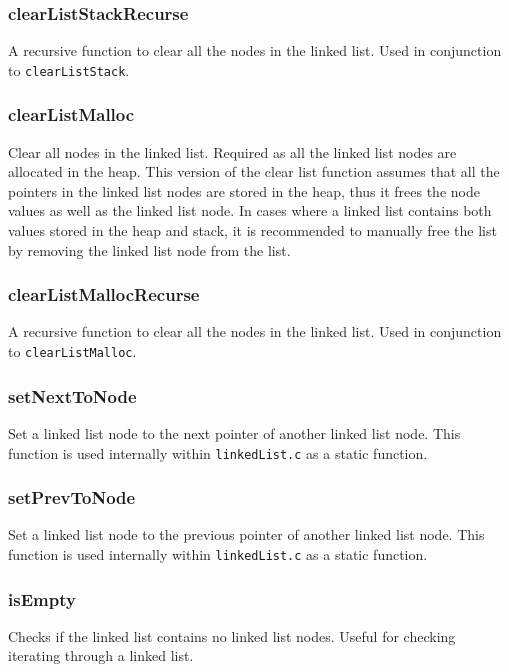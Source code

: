 \documentclass[a4paper, 12pt, titlepage]{article}
\newcommand{\code}[1]{\small\texttt{#1}\normalsize}
\begin{document}
\subsubsection{clearListStackRecurse}

A recursive function to clear all the nodes in the linked list. Used in
conjunction to \code{clearListStack}.

\subsubsection{clearListMalloc}

Clear all nodes in the linked list. Required as all the linked list nodes are
allocated in the heap. This version of the clear list function assumes that
all the pointers in the linked list nodes are stored in the heap, thus it
frees the node values as well as the linked list node. In cases where a
linked list contains both values stored in the heap and stack, it is
recommended to manually free the list by removing the linked list node from
the list.

\subsubsection{clearListMallocRecurse}

A recursive function to clear all the nodes in the linked list. Used in
conjunction to \code{clearListMalloc}.

\subsubsection{setNextToNode}

Set a linked list node to the next pointer of another linked list node. This
function is used internally within \code{linkedList.c} as a static function.

\subsubsection{setPrevToNode}

Set a linked list node to the previous pointer of another linked list node.
This function is used internally within \code{linkedList.c} as a static
function.

\subsubsection{isEmpty}

Checks if the linked list contains no linked list nodes. Useful for checking
iterating through a linked list.
\end{document}
